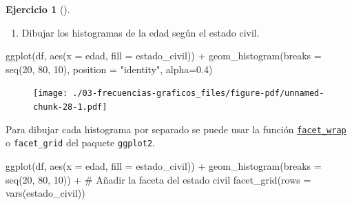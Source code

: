 \documentclass[
  a4paper,
]{scrreport}
\newenvironment{Shaded}{\begin{snugshade}}{\end{snugshade}}
\newcommand{\AttributeTok}[1]{\textcolor[rgb]{0.40,0.45,0.13}{#1}}
\newcommand{\CommentTok}[1]{\textcolor[rgb]{0.37,0.37,0.37}{#1}}
\newcommand{\DecValTok}[1]{\textcolor[rgb]{0.68,0.00,0.00}{#1}}
\newcommand{\FloatTok}[1]{\textcolor[rgb]{0.68,0.00,0.00}{#1}}
\newcommand{\FunctionTok}[1]{\textcolor[rgb]{0.28,0.35,0.67}{#1}}
\newcommand{\NormalTok}[1]{\textcolor[rgb]{0.00,0.23,0.31}{#1}}
\newcommand{\SpecialCharTok}[1]{\textcolor[rgb]{0.37,0.37,0.37}{#1}}
\newcommand{\StringTok}[1]{\textcolor[rgb]{0.13,0.47,0.30}{#1}}
\providecommand{\tightlist}{%
  \setlength{\itemsep}{0pt}\setlength{\parskip}{0pt}}\usepackage{longtable,booktabs,array}
\theoremstyle{definition}
\newtheorem{exercise}{Ejercicio}[chapter]
\theoremstyle{remark}
\begin{document}
\begin{exercise}[]
\begin{tcolorbox}
\begin{figure}[H]
{}

\end{figure}

\end{tcolorbox}

\begin{enumerate}
\def\labelenumi{\alph{enumi}.}
\setcounter{enumi}{3}
\tightlist
\item
  Dibujar los histogramas de la edad según el estado civil.
\end{enumerate}

\begin{tcolorbox}[enhanced jigsaw, rightrule=.15mm, toptitle=1mm, colbacktitle=quarto-callout-tip-color!10!white, titlerule=0mm, colback=white, leftrule=.75mm, bottomtitle=1mm, colframe=quarto-callout-tip-color-frame, breakable, title=\textcolor{quarto-callout-tip-color}{\faLightbulb}\hspace{0.5em}{Solución}, arc=.35mm, coltitle=black, opacityback=0, bottomrule=.15mm, opacitybacktitle=0.6, left=2mm, toprule=.15mm]

\begin{Shaded}
\begin{Highlighting}[]
\FunctionTok{ggplot}\NormalTok{(df, }\FunctionTok{aes}\NormalTok{(}\AttributeTok{x =}\NormalTok{ edad, }\AttributeTok{fill =}\NormalTok{ estado\_civil)) }\SpecialCharTok{+}
    \FunctionTok{geom\_histogram}\NormalTok{(}\AttributeTok{breaks =} \FunctionTok{seq}\NormalTok{(}\DecValTok{20}\NormalTok{, }\DecValTok{80}\NormalTok{, }\DecValTok{10}\NormalTok{), }\AttributeTok{position =} \StringTok{"identity"}\NormalTok{, }\AttributeTok{alpha=}\FloatTok{0.4}\NormalTok{)}
\end{Highlighting}
\end{Shaded}

\begin{figure}[H]

{\centering \texttt{[image: ./03-frecuencias-graficos\_files/figure-pdf/unnamed-chunk-28-1.pdf]}

}

\end{figure}

Para dibujar cada histograma por separado se puede usar la función
\href{https://aprendeconalf.es/manual-r/07-graficos.html\#facetas}{\texttt{facet\_wrap}}
o \texttt{facet\_grid} del paquete \texttt{ggplot2}.

\begin{Shaded}
\begin{Highlighting}[]
\FunctionTok{ggplot}\NormalTok{(df, }\FunctionTok{aes}\NormalTok{(}\AttributeTok{x =}\NormalTok{ edad, }\AttributeTok{fill =}\NormalTok{ estado\_civil)) }\SpecialCharTok{+}
    \FunctionTok{geom\_histogram}\NormalTok{(}\AttributeTok{breaks =} \FunctionTok{seq}\NormalTok{(}\DecValTok{20}\NormalTok{, }\DecValTok{80}\NormalTok{, }\DecValTok{10}\NormalTok{)) }\SpecialCharTok{+}
    \CommentTok{\# Añadir la faceta del estado civil}
    \FunctionTok{facet\_grid}\NormalTok{(}\AttributeTok{rows =} \FunctionTok{vars}\NormalTok{(estado\_civil))}
\end{Highlighting}
\end{Shaded}


\end{tcolorbox}
\end{exercise}
\end{document}

